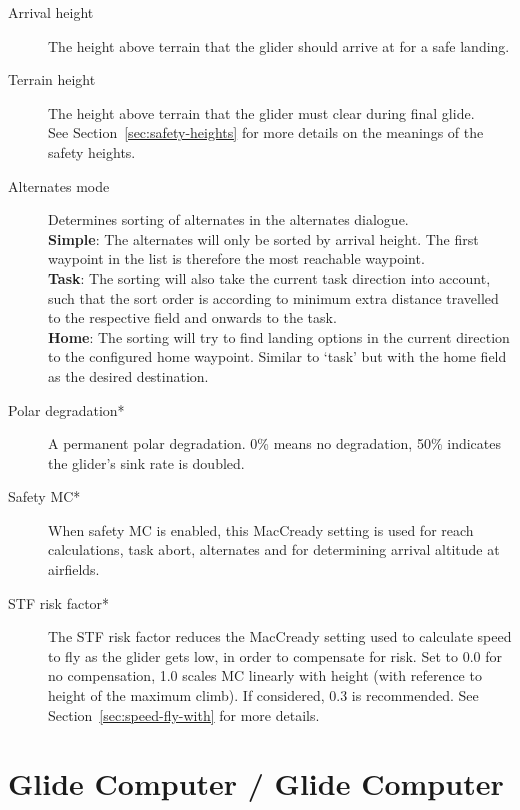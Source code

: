 \begin{description}
\item[Arrival height]  The height above terrain that the glider
  should arrive at for a safe landing.
\item[Terrain height]  \label{conf:safetyterrain} The height above terrain that the glider must
  clear during final glide.
\\
See Section~\ref{sec:safety-heights} for more details on the meanings
of the safety heights.
\\
\item[Alternates mode]  \label{conf:alternatesmode} Determines sorting of alternates 
  in the alternates dialogue. \\
  {\bf Simple}: The alternates will only be sorted by arrival height. 
    The first waypoint in the list is therefore the most reachable waypoint. \\
  {\bf Task}: The sorting will also take the current task direction into account, 
    such that the sort order is according to minimum extra distance travelled to 
    the respective field and onwards to the task. \\
  {\bf Home}: The sorting will try to find landing options in the current direction 
    to the configured home waypoint.  Similar to `task' but with 
    the home field as the desired destination.
\item[Polar degradation*]  A permanent polar degradation. 0\% means no degradation, 
  50\% indicates the glider's sink rate is doubled.
\item[Safety MC*]  When safety MC is enabled, this MacCready setting is used for reach 
  calculations, task abort, alternates and for determining arrival altitude at airfields. 
\item[STF risk factor*] 
  The STF risk factor reduces the MacCready setting used to calculate
  speed to fly as the glider gets low, in order to compensate for
  risk.  Set to 0.0 for no compensation, 1.0 scales MC linearly with
  height (with reference to height of the maximum climb). If considered, 0.3 is recommended.  
  See Section~\ref{sec:speed-fly-with} for more details.
\end{description}


\section{Glide Computer / Glide Computer}\label{sec:final-glide}

